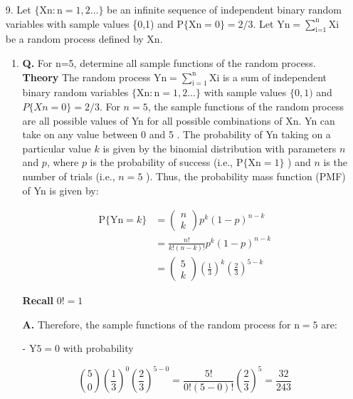 \documentclass[main.tex]{subfiles}
\begin{document}
\begin{enumerate}
\begin{enumerate}
    \end{enumerate}

\item [9.] Let $\{\mathrm{Xn}: \mathrm{n}=1,2 \ldots\}$ be an infinite sequence of independent binary random variables with sample values \{0,1) and $\mathrm{P}\{\mathrm{Xn}=0\} = 2/3$. Let $\mathrm{Yn}=\sum_{\text{i=1}}^{\text{n}} \mathrm{Xi}$ be a random process defined by $\mathrm{Xn}$.

    \begin{enumerate}
        \item \textbf{Q.} For n=5, determine all sample functions of the random process. \textbf{Theory} The random process $\mathrm{Yn}=\sum_{\mathrm{i}=1}^{\mathrm{n}} \mathrm{Xi}$ is a sum of independent binary random variables $\{\mathrm{Xn}: \mathrm{n}=1,2 \ldots\}$ with sample values $\{0,1)$ and $P\{X n=0\}=2 / 3$. For $n=5$, the sample functions of the random process are all possible values of Yn for all possible combinations of $\mathrm{Xn}$. Yn can take on any value between 0 and 5 . The probability of Yn taking on a particular value $k$ is given by the binomial distribution with parameters $n$ and $p$, where $p$ is the probability of success (i.e., $\mathrm{P}\{\mathrm{Xn}=1\}$ ) and $n$ is the number of trials (i.e., $n=5$ ). Thus, the probability mass function (PMF) of Yn is given by:
        
        $$
        \begin{aligned}
        \mathrm{P}\{\mathrm{Yn}=k\} & =\left(\begin{array}{l}
        n \\
        k
        \end{array}\right) p^k(1-p)^{n-k} \\
        & = \frac{n !}{k !(n-k) !} p^k(1-p)^{n-k}\\ 
        & = \left(\begin{array}{l}
        5 \\
        k
        \end{array}\right)\left(\frac{1}{3}\right)^k\left(\frac{2}{3}\right)^{5-k}
        \end{aligned}
        $$

        \textbf{Recall} $0! = 1$
        
        \textbf{A.} Therefore, the sample functions of the random process for $\mathrm{n}=5$ are:
        
        
        - $\mathrm{Y}5=0$ with probability 

        $$
        \binom{5}{0}\left(\frac{1}{3}\right)^0\left(\frac{2}{3}\right)^{5-0} = \frac{5 !}{0 !(5-0) !}\left(\frac{2}{3}\right)^5=\frac{32}{243}
        $$
        

\end{enumerate}
\end{enumerate}
\end{document}
